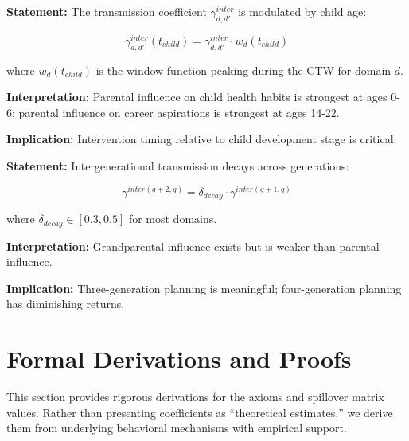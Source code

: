\begin{tcolorbox}[colback=gray!5!white, colframe=gray!75!black,
    title=Axiom UNMAPPED_COR-3: Window Sensitivity]
\textbf{Statement:} The transmission coefficient $\gamma^{inter}_{d,d'}$ is modulated by child age:

\begin{equation}
\gamma^{inter}_{d,d'}(t_{child}) = \gamma^{inter}_{d,d'} \cdot w_d(t_{child})
\end{equation}

where $w_d(t_{child})$ is the window function peaking during the CTW for domain $d$.

\textbf{Interpretation:} Parental influence on child health habits is strongest at ages 0-6;
parental influence on career aspirations is strongest at ages 14-22.

\textbf{Implication:} Intervention timing relative to child development stage is critical.
\end{tcolorbox}

\begin{tcolorbox}[colback=gray!5!white, colframe=gray!75!black,
    title=Axiom UNMAPPED_COR-4: Generational Decay]
\textbf{Statement:} Intergenerational transmission decays across generations:

\begin{equation}
\gamma^{inter(g+2,g)} = \delta_{decay} \cdot \gamma^{inter(g+1,g)}
\end{equation}

where $\delta_{decay} \in [0.3, 0.5]$ for most domains.

\textbf{Interpretation:} Grandparental influence exists but is weaker than parental influence.

\textbf{Implication:} Three-generation planning is meaningful; four-generation planning has diminishing returns.
\end{tcolorbox}


\section{Formal Derivations and Proofs}
\label{sec:BI-proofs}

\begin{tcolorbox}[colback=blue!5!white, colframe=blue!75!black, title=Purpose]
This section provides rigorous derivations for the axioms and spillover matrix values.
Rather than presenting coefficients as ``theoretical estimates,'' we derive them from
underlying behavioral mechanisms with empirical support.
\end{tcolorbox}

